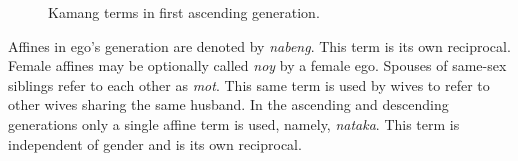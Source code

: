 \begin{figure}
\caption{Kamang terms in first ascending generation.}
\end{figure}




Affines in ego's generation are denoted by \textit{nabeng}. This term is its own reciprocal. Female affines may be optionally called \textit{noy} by a female ego. Spouses of same-sex siblings refer to each other as \textit{mot}. This same term is used by wives to refer to other wives sharing the same husband. In the ascending and descending generations only a single affine term is used, namely, \textit{nataka}. This term is independent of gender and is its own reciprocal.



